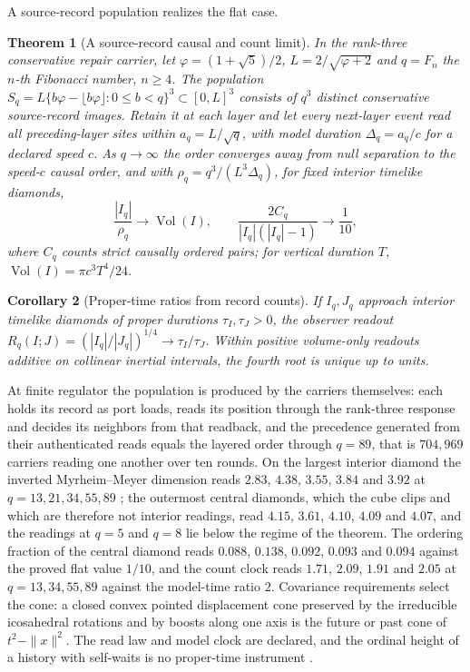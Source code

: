 \documentclass[11pt]{article}
\newtheorem{theorem}{Theorem}[section]
\newtheorem{corollary}[theorem]{Corollary}
\theoremstyle{definition}
\theoremstyle{remark}
\begin{document}
A source-record population realizes the flat case.

\begin{theorem}[A source-record causal and count limit]
\label{thm:source-record-causal-count}
In the rank-three conservative repair carrier, let
$\varphi=(1+\sqrt5)/2$, $L=2/\sqrt{\varphi+2}$ and $q=F_n$ the $n$-th Fibonacci number, $n\geq4$. The
population
$S_q=L\{b\varphi-\lfloor b\varphi\rfloor:0\leq b<q\}^{3}\subset[0,L]^3$
consists of $q^3$ distinct conservative source-record images. Retain it at
each layer and let every next-layer event read all preceding-layer sites
within $a_q=L/\sqrt q$, with model duration $\Delta_q=a_q/c$ for a declared speed $c$. As
$q\to\infty$ the order converges away from null separation to the speed-$c$
causal order, and with $\rho_q=q^3/(L^3\Delta_q)$, for fixed interior
timelike diamonds,
\[
 \frac{|I_q|}{\rho_q}\longrightarrow\operatorname{Vol}(I),
 \qquad
 \frac{2C_q}{|I_q|(|I_q|-1)}\longrightarrow\frac1{10},
\]
where $C_q$ counts strict causally ordered pairs; for vertical duration $T$,
$\operatorname{Vol}(I)=\pi c^3T^4/24$.
\end{theorem}

\begin{corollary}[Proper-time ratios from record counts]
\label{cor:count-clock}
If $I_q,J_q$ approach interior timelike diamonds of proper durations
$\tau_I,\tau_J>0$, the observer readout
$R_q(I;J)=(|I_q|/|J_q|)^{1/4}\to\tau_I/\tau_J$. Within positive volume-only
readouts additive on collinear inertial intervals, the fourth root is unique
up to units.
\end{corollary}

At finite regulator the population is produced by the carriers themselves:
each holds its record as port loads, reads its position through the
rank-three response and decides its neighbors from that readback, and the
precedence generated from their authenticated reads equals the layered order
through $q=89$, that is $704{,}969$ carriers reading one another over ten
rounds. On the largest interior diamond the inverted Myrheim--Meyer dimension reads $2.83$, $4.38$, $3.55$, $3.84$ and $3.92$ at $q=13,21,34,55,89$ \cite{myrheim1978,meyer1988}; the outermost central diamonds, which the cube clips and which are therefore not interior readings, read $4.15$, $3.61$, $4.10$, $4.09$ and $4.07$, and the readings at $q=5$ and $q=8$ lie below the regime of the theorem. The ordering fraction of the central diamond reads $0.088$, $0.138$, $0.092$, $0.093$ and $0.094$ against the proved flat value $1/10$, and the count clock reads $1.71$, $2.09$, $1.91$ and $2.05$ at $q=13,34,55,89$ against the model-time ratio $2$. Covariance requirements
select the cone: a closed convex pointed displacement cone preserved by the
irreducible icosahedral rotations and by boosts along one axis is the future
or past cone of $t^2-\|x\|^2$. The read law and model clock are declared, and
the ordinal height of a history with self-waits is no proper-time instrument
\cite{ophEinstein}.
\end{document}
